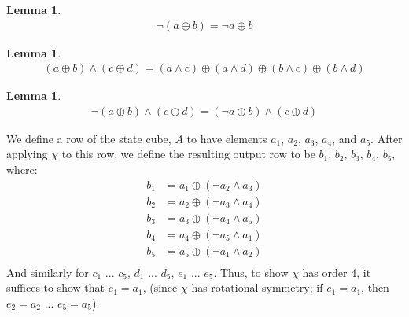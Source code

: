 \documentclass[10pt,twocolumn,twoside]{pnas-new}
\newtheorem{lemma}[theorem]{Lemma}
\begin{document}
\begin{lemma} \label{lem:p:c:1}
\begin{align*}
    \lnot(a \oplus b) = \lnot a \oplus b
\end{align*}
\end{lemma}

\begin{lemma} \label{lem:p:c:2}
\begin{align*}
    (a \oplus b) \land (c \oplus d) = (a \land c) \oplus (a \land d) \oplus (b \land c) \oplus (b \land d)
\end{align*}
\end{lemma}

\begin{lemma} \label{lem:p:c:3}
\begin{align*}
    \lnot(a \oplus b) \land (c \oplus d) = (\lnot a \oplus b) \land (c \oplus d)
\end{align*}
\end{lemma}

We define a row of the state cube, $A$ to have elements $a_1$, $a_2$, $a_3$,
$a_4$, and $a_5$. After applying $\chi$ to this row, we define the resulting
output row to be $b_1$, $b_2$, $b_3$, $b_4$, $b_5$, where:
\begin{align*}
    b_1 & = a_1 \oplus (\lnot a_2 \land a_3) \\
    b_2 & = a_2 \oplus (\lnot a_3 \land a_4) \\
    b_3 & = a_3 \oplus (\lnot a_4 \land a_5) \\
    b_4 & = a_4 \oplus (\lnot a_5 \land a_1) \\
    b_5 & = a_5 \oplus (\lnot a_1 \land a_2) \\
\end{align*}
And similarly for $c_1$ ... $c_5$,  $d_1$ ... $d_5$, $e_1$ ... $e_5$. Thus, to
show $\chi$ has order 4, it suffices to show that $e_1 = a_1$, (since $\chi$
has rotational symmetry; if $e_1 = a_1$, then $e_2 = a_2$ ... $e_5 = a_5$).
\end{document}
